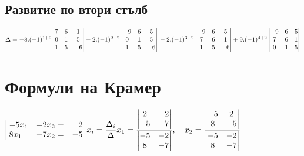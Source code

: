 \documentclass{article}
\begin{document}
    \subsection{Развитие по втори стълб}
    \(\Delta = -8.(-1)^{1 + 2} \begin{vmatrix}
        7 & 6 & 1\\
        0 & 1 & 5\\
        1 & 5 & -6
    \end{vmatrix} - 2.(-1)^{2 + 2} \begin{vmatrix}
        -9 & 6 & 5\\
        0 & 1 & 5\\
        1 & 5 & -6
    \end{vmatrix} \\\\\\
    - 2.(-1)^{3 + 2} \begin{vmatrix}
        -9 & 6 & 5\\
        7 & 6 & 1\\
        1 & 5 & -6
    \end{vmatrix} + 9.(-1)^{4 + 2} \begin{vmatrix}
        -9 & 6 & 5\\
        7 & 6 & 1\\
        0 & 1 & 5
    \end{vmatrix}\)
    \section{Формули на Крамер}
    \(\begin{array}{|lcr}
        -5x_1 & -2x_2 = & 2\\
        8x_1 & -7x_2 = & - 5
    \end{array}\\\\
    x_i = \displaystyle\frac{\Delta_{i}}{\Delta}\\\\
    x_1 = \displaystyle\frac{\begin{vmatrix}
        2 & -2\\
        -5 & -7
    \end{vmatrix}}{\begin{vmatrix}
        -5 & -2\\
        8 & -7
    \end{vmatrix}}, \quad  x_2 = \displaystyle\frac{\begin{vmatrix}
        -5 & 2\\
        8 & -5
    \end{vmatrix}}{\begin{vmatrix}
        -5 & -2\\
        8 & -7
    \end{vmatrix}}\)
\end{document}
